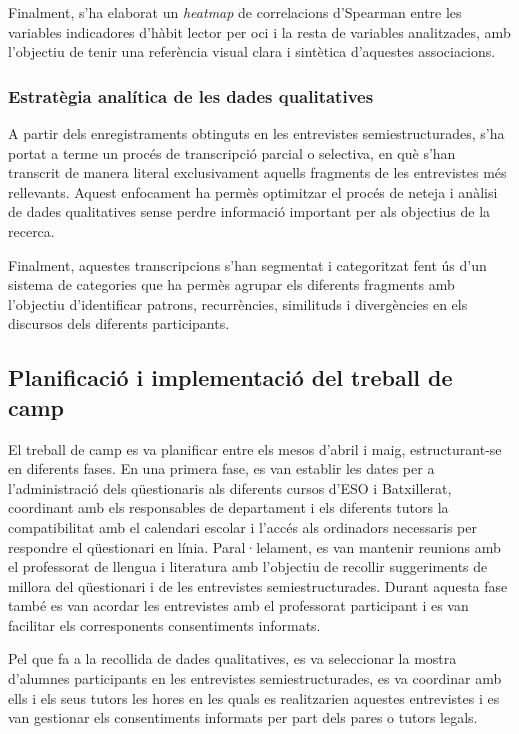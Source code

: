 \documentclass[12pt]{article}
\begin{document}
Finalment, s'ha elaborat un \emph{heatmap} de correlacions d'Spearman entre les variables indicadores d’hàbit lector per oci i la resta de variables analitzades, amb l'objectiu de tenir una referència visual clara i sintètica d'aquestes associacions.

\subsubsection{Estratègia analítica de les dades qualitatives}

A partir dels enregistraments obtinguts en les entrevistes semiestructurades, s'ha portat a terme un procés de transcripció parcial o selectiva, en què s'han transcrit de manera literal exclusivament aquells fragments de les entrevistes més rellevants. Aquest enfocament ha permès optimitzar el procés de neteja i anàlisi de dades qualitatives sense perdre informació important per als objectius de la recerca.

Finalment, aquestes transcripcions s'han segmentat i categoritzat fent ús d'un sistema de categories que ha permès agrupar els diferents fragments amb l’objectiu d'identificar patrons, recurrències, similituds i divergències en els discursos dels diferents participants.

\subsection{Planificació i implementació del treball de camp}

El treball de camp es va planificar entre els mesos d’abril i maig, estructurant-se en diferents fases. En una primera fase, es van establir les dates per a l’administració dels qüestionaris als diferents cursos d’ESO i Batxillerat, coordinant amb els responsables de departament i els diferents tutors la compatibilitat amb el calendari escolar i l’accés als ordinadors necessaris per respondre el qüestionari en línia. Paral·lelament, es van mantenir reunions amb el professorat de llengua i literatura amb l’objectiu de recollir suggeriments de millora del qüestionari i de les entrevistes semiestructurades. Durant aquesta fase també es van acordar les entrevistes amb el professorat participant i es van facilitar els corresponents consentiments informats.

Pel que fa a la recollida de dades qualitatives, es va seleccionar la mostra d’alumnes participants en les entrevistes semiestructurades, es va coordinar amb ells i els seus tutors les hores en les quals es realitzarien aquestes entrevistes i es van gestionar els consentiments informats per part dels pares o tutors legals.
\end{document}
